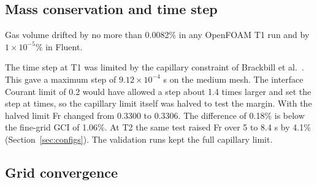 \documentclass[11pt,a4paper]{article}
\begin{document}
\subsection{Mass conservation and time step}
\label{sec:dt}

Gas volume drifted by no more than 0.0082\% in any OpenFOAM T1 run and by $1\times10^{-5}\%$ in Fluent.

The time step at T1 was limited by the capillary constraint of Brackbill et al.\ \cite{brackbill1992continuum}. This gave a maximum step of $9.12\times10^{-4}$ s on the medium mesh. The interface Courant limit of 0.2 would have allowed a step about 1.4 times larger and set the step at times, so the capillary limit itself was halved to test the margin. With the halved limit Fr changed from 0.3300 to 0.3306. The difference of 0.18\% is below the fine-grid GCI of 1.06\%. At T2 the same test raised Fr over 5 to 8.4 s by 4.1\% (Section~\ref{sec:configs}). The validation runs kept the full capillary limit.

\subsection{Grid convergence}
\label{sec:grid}
\end{document}
